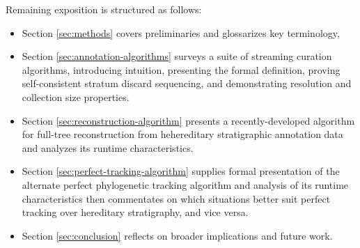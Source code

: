 Remaining exposition is structured as follows:
\begin{itemize}
\item Section \ref{sec:methods} covers preliminaries and glossarizes key terminology,
\item Section \ref{sec:annotation-algorithms} surveys a suite of streaming curation algorithms, introducing intuition, presenting the formal definition, proving self-consistent stratum discard sequencing, and demonstrating resolution and collection size properties.
\item Section \ref{sec:reconstruction-algorithm} presents a recently-developed algorithm for full-tree reconstruction from hehereditary stratigraphic annotation data and analyzes its runtime characteristics.
\item Section \ref{sec:perfect-tracking-algorithm} supplies formal presentation of the alternate perfect phylogenetic tracking algorithm and analysis of its runtime characteristics then commentates on which situations better suit perfect tracking over hereditary stratigraphy, and vice versa.
\item Section \ref{sec:conclusion} reflects on broader implications and future work.
\end{itemize}
